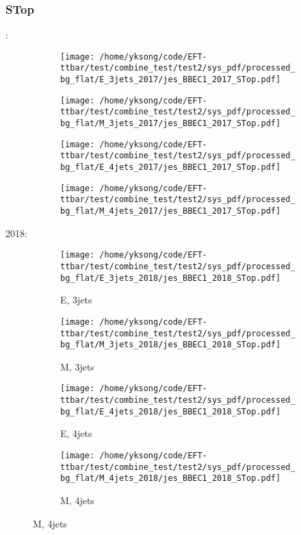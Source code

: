 \documentclass{beamer}
\begin{document}
\begin{frame}
\frametitle{STop}
\fontsize{5}{1}:
\begin{figure}
\centering
\begin{subfigure}[b]{0.24\textwidth}
\texttt{[image: /home/yksong/code/EFT-ttbar/test/combine\_test/test2/sys\_pdf/processed\_bg\_flat/E\_3jets\_2017/jes\_BBEC1\_2017\_STop.pdf]}
\end{subfigure}
\begin{subfigure}[b]{0.24\textwidth}
\texttt{[image: /home/yksong/code/EFT-ttbar/test/combine\_test/test2/sys\_pdf/processed\_bg\_flat/M\_3jets\_2017/jes\_BBEC1\_2017\_STop.pdf]}
\end{subfigure}
\begin{subfigure}[b]{0.24\textwidth}
\texttt{[image: /home/yksong/code/EFT-ttbar/test/combine\_test/test2/sys\_pdf/processed\_bg\_flat/E\_4jets\_2017/jes\_BBEC1\_2017\_STop.pdf]}
\end{subfigure}
\begin{subfigure}[b]{0.24\textwidth}
\texttt{[image: /home/yksong/code/EFT-ttbar/test/combine\_test/test2/sys\_pdf/processed\_bg\_flat/M\_4jets\_2017/jes\_BBEC1\_2017\_STop.pdf]}
\end{subfigure}
\end{figure}
2018:
\begin{figure}
\centering
\begin{subfigure}[b]{0.24\textwidth}
\texttt{[image: /home/yksong/code/EFT-ttbar/test/combine\_test/test2/sys\_pdf/processed\_bg\_flat/E\_3jets\_2018/jes\_BBEC1\_2018\_STop.pdf]}
\captionsetup{font=tiny}
\caption{E, 3jets}
\end{subfigure}
\begin{subfigure}[b]{0.24\textwidth}
\texttt{[image: /home/yksong/code/EFT-ttbar/test/combine\_test/test2/sys\_pdf/processed\_bg\_flat/M\_3jets\_2018/jes\_BBEC1\_2018\_STop.pdf]}
\captionsetup{font=tiny}
\caption{M, 3jets}
\end{subfigure}
\begin{subfigure}[b]{0.24\textwidth}
\texttt{[image: /home/yksong/code/EFT-ttbar/test/combine\_test/test2/sys\_pdf/processed\_bg\_flat/E\_4jets\_2018/jes\_BBEC1\_2018\_STop.pdf]}
\captionsetup{font=tiny}
\caption{E, 4jets}
\end{subfigure}
\begin{subfigure}[b]{0.24\textwidth}
\texttt{[image: /home/yksong/code/EFT-ttbar/test/combine\_test/test2/sys\_pdf/processed\_bg\_flat/M\_4jets\_2018/jes\_BBEC1\_2018\_STop.pdf]}
\captionsetup{font=tiny}
\caption{M, 4jets}
\end{subfigure}
\end{figure}
\end{frame}
\end{document}
